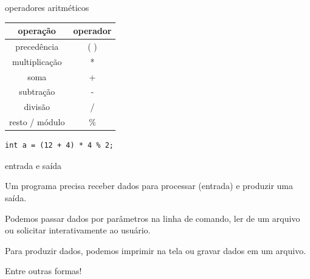 \documentclass{beamer}
\begin{document}
\begin{frame}[fragile]{operadores aritméticos}

  \begin{center}
    \begin{tabular}{cc}
      \hline
      operação & operador\\
      \hline
      precedência & ( )\\
      multiplicação & *\\
      soma & +\\
      subtração & -\\
      divisão & /\\
      resto / módulo & \%\\
      \hline
    \end{tabular}
  \end{center}
  
  \vfill
  
  \begin{lstlisting}[style=normalc]
    int a = (12 + 4) * 4 % 2;
  \end{lstlisting}
  
\end{frame}


\begin{frame}{entrada e saída}

  Um programa precisa receber dados para processar (entrada) e
  produzir uma saída.

  Podemos passar dados por parâmetros na linha de comando, ler de um
  arquivo ou solicitar interativamente ao usuário.

  Para produzir dados, podemos imprimir na tela ou gravar dados em um
  arquivo.

  Entre outras formas!
  
\end{frame}
\end{document}
